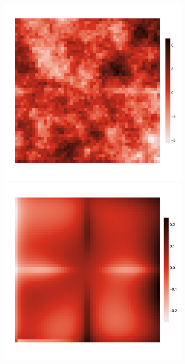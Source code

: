 \documentclass{article}
\begin{document}
\begin{figure}
\begin{subfigure}{0.3\textwidth}
		\includegraphics[width=\linewidth]{figures/res111}\\
		\includegraphics[width=\linewidth]{figures/res112}\\

\end{subfigure}
\end{figure}
\end{document}
